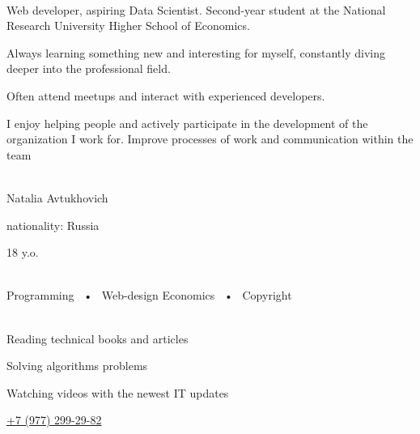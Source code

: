 \documentclass[myoption]{simplehipstercv}
\begin{document}
\begin{paracol}{2}
\paracolbackgroundoptions


\footnotesize
{\setasidefontcolour
\raggedright
{}
\begin{center}
\end{center}

\\[0.5em]

{\footnotesize
Web developer, aspiring Data Scientist. Second-year student at the National Research University Higher School of Economics. 

Always learning something new and interesting for myself, constantly diving deeper into the professional field. 

Often attend meetups and interact with experienced developers.

I enjoy helping people  and actively participate in the development of the organization I work for.
Improve processes of work and communication within the team}
\bigskip

 \\[0.5em]
Natalia Avtukhovich

nationality: Russia 

18 y.o.

\bigskip

 \\[0.5em]

Programming ~•~ Web-design Economics ~•~ Copyright

\bigskip

\bigskip

\\[0.5em]
Reading technical books and articles

Solving algorithms problems

Watching videos with the newest IT updates
\bigskip

\vspace{0.8em}
\vspace{0.8em}
\vspace{0.8em}
 {\href{tel:89772992982}{+7 (977) 299-29-82}}
\phantom{turn the page}

}
\end{paracol}
\end{document}
